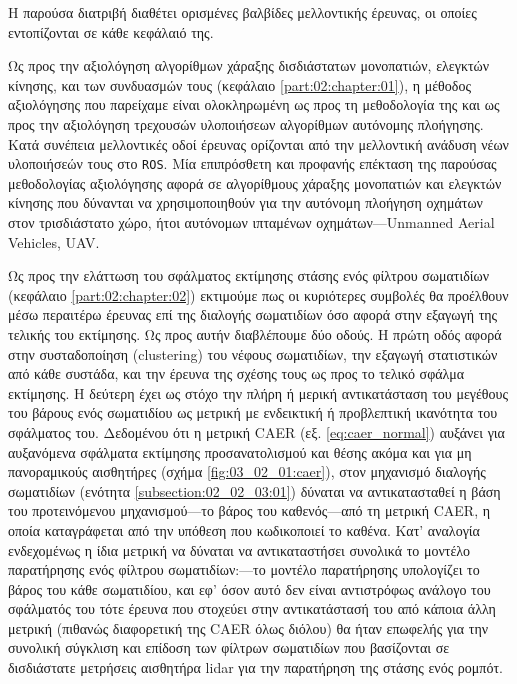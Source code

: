 Η παρούσα διατριβή διαθέτει ορισμένες βαλβίδες μελλοντικής έρευνας, οι οποίες
εντοπίζονται σε κάθε κεφάλαιό της.

Ως προς την αξιολόγηση αλγορίθμων χάραξης δισδιάστατων μονοπατιών, ελεγκτών
κίνησης, και των συνδυασμών τους (κεφάλαιο \ref{part:02:chapter:01}), η μέθοδος
αξιολόγησης που παρείχαμε είναι ολοκληρωμένη ως προς τη μεθοδολογία της και ως
προς την αξιολόγηση τρεχουσών υλοποιήσεων αλγορίθμων αυτόνομης πλοήγησης. Κατά
συνέπεια μελλοντικές οδοί έρευνας ορίζονται από την μελλοντική ανάδυση νέων
υλοποιήσεών τους στο \texttt{ROS}. Μία επιπρόσθετη και προφανής επέκταση της
παρούσας μεθοδολογίας αξιολόγησης αφορά σε αλγορίθμους χάραξης μονοπατιών και
ελεγκτών κίνησης που δύνανται να χρησιμοποιηθούν για την αυτόνομη πλοήγηση
οχημάτων στον τρισδιάστατο χώρο, ήτοι αυτόνομων ιπταμένων οχημάτων---Unmanned
Aerial Vehicles, UAV.

Ως προς την ελάττωση του σφάλματος εκτίμησης στάσης ενός φίλτρου σωματιδίων
(κεφάλαιο \ref{part:02:chapter:02}) εκτιμούμε πως οι κυριότερες συμβολές θα
προέλθουν μέσω περαιτέρω έρευνας επί της διαλογής σωματιδίων όσο αφορά στην
εξαγωγή της τελικής του εκτίμησης. Ως προς αυτήν διαβλέπουμε δύο οδούς. Η πρώτη
οδός αφορά στην συσταδοποίηση (clustering) του νέφους σωματιδίων, την εξαγωγή
στατιστικών από κάθε συστάδα, και την έρευνα της σχέσης τους ως προς το τελικό
σφάλμα εκτίμησης.  Η δεύτερη έχει ως στόχο την πλήρη ή μερική αντικατάσταση του
μεγέθους του βάρους ενός σωματιδίου ως μετρική με ενδεικτική ή προβλεπτική
ικανότητα του σφάλματος του.  Δεδομένου ότι η μετρική CAER (εξ.
\ref{eq:caer_normal}) αυξάνει για αυξανόμενα σφάλματα εκτίμησης προσανατολισμού
και θέσης ακόμα και για μη πανοραμικούς αισθητήρες (σχήμα
\ref{fig:03_02_01:caer}), στον μηχανισμό διαλογής σωματιδίων (ενότητα
\ref{subsection:02_02_03:01}) δύναται να αντικατασταθεί η βάση του
προτεινόμενου μηχανισμού---το βάρος του καθενός---από τη μετρική CAER, η οποία
καταγράφεται από την υπόθεση που κωδικοποιεί το καθένα. Κατ' αναλογία
ενδεχομένως η ίδια μετρική να δύναται να αντικαταστήσει συνολικά το μοντέλο
παρατήρησης ενός φίλτρου σωματιδίων:---το μοντέλο παρατήρησης υπολογίζει το
βάρος του κάθε σωματιδίου, και εφ' όσον αυτό δεν είναι αντιστρόφως ανάλογο του
σφάλματός του τότε έρευνα που στοχεύει στην αντικατάστασή του από κάποια άλλη
μετρική (πιθανώς διαφορετική της CAER όλως διόλου) θα ήταν επωφελής για την
συνολική σύγκλιση και επίδοση των φίλτρων σωματιδίων που βασίζονται σε
δισδιάστατε μετρήσεις αισθητήρα lidar για την παρατήρηση της στάσης ενός
ρομπότ.

